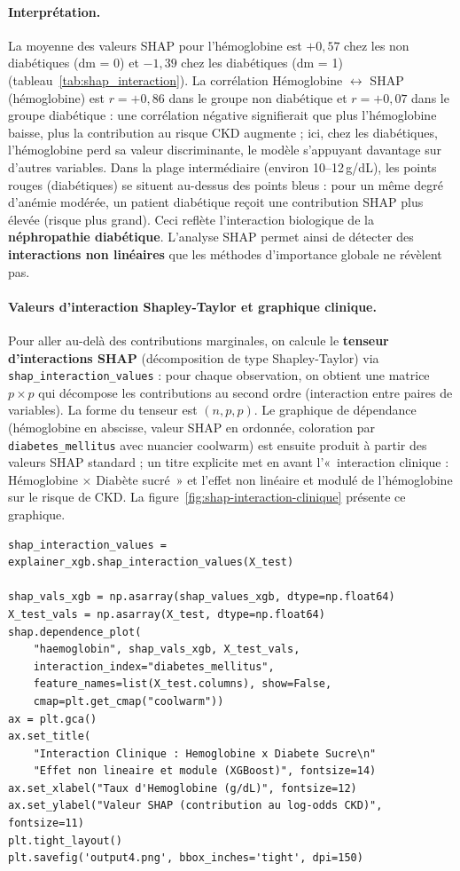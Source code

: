 \paragraph{Interprétation.}
La moyenne des valeurs SHAP pour l'hémoglobine est $+0{,}57$ chez les non diabétiques (dm = 0) et $-1{,}39$ chez les diabétiques (dm = 1) (tableau~\ref{tab:shap_interaction}). La corrélation Hémoglobine $\leftrightarrow$ SHAP (hémoglobine) est $r = +0{,}86$ dans le groupe non diabétique et $r = +0{,}07$ dans le groupe diabétique : une corrélation négative signifierait que plus l'hémoglobine baisse, plus la contribution au risque CKD augmente ; ici, chez les diabétiques, l'hémoglobine perd sa valeur discriminante, le modèle s'appuyant davantage sur d'autres variables. Dans la plage intermédiaire (environ 10--12\,g/dL), les points rouges (diabétiques) se situent au-dessus des points bleus : pour un même degré d'anémie modérée, un patient diabétique reçoit une contribution SHAP plus élevée (risque plus grand). Ceci reflète l'interaction biologique de la \textbf{néphropathie diabétique}. L'analyse SHAP permet ainsi de détecter des \textbf{interactions non linéaires} que les méthodes d'importance globale ne révèlent pas.

\paragraph{Valeurs d'interaction Shapley-Taylor et graphique clinique.}
Pour aller au-delà des contributions marginales, on calcule le \textbf{tenseur d'interactions SHAP} (décomposition de type Shapley-Taylor) via \texttt{shap\_interaction\_values} : pour chaque observation, on obtient une matrice $p \times p$ qui décompose les contributions au second ordre (interaction entre paires de variables). La forme du tenseur est $(n, p, p)$. Le graphique de dépendance (hémoglobine en abscisse, valeur SHAP en ordonnée, coloration par \texttt{diabetes\_mellitus} avec nuancier coolwarm) est ensuite produit à partir des valeurs SHAP standard ; un titre explicite met en avant l'«~interaction clinique : Hémoglobine $\times$ Diabète sucré~» et l'effet non linéaire et modulé de l'hémoglobine sur le risque de CKD. La figure~\ref{fig:shap-interaction-clinique} présente ce graphique.

\begin{lstlisting}[style=reportPython]
shap_interaction_values = explainer_xgb.shap_interaction_values(X_test)

shap_vals_xgb = np.asarray(shap_values_xgb, dtype=np.float64)
X_test_vals = np.asarray(X_test, dtype=np.float64)
shap.dependence_plot(
    "haemoglobin", shap_vals_xgb, X_test_vals,
    interaction_index="diabetes_mellitus",
    feature_names=list(X_test.columns), show=False,
    cmap=plt.get_cmap("coolwarm"))
ax = plt.gca()
ax.set_title(
    "Interaction Clinique : Hemoglobine x Diabete Sucre\n"
    "Effet non lineaire et module (XGBoost)", fontsize=14)
ax.set_xlabel("Taux d'Hemoglobine (g/dL)", fontsize=12)
ax.set_ylabel("Valeur SHAP (contribution au log-odds CKD)", fontsize=11)
plt.tight_layout()
plt.savefig('output4.png', bbox_inches='tight', dpi=150)
\end{lstlisting}

